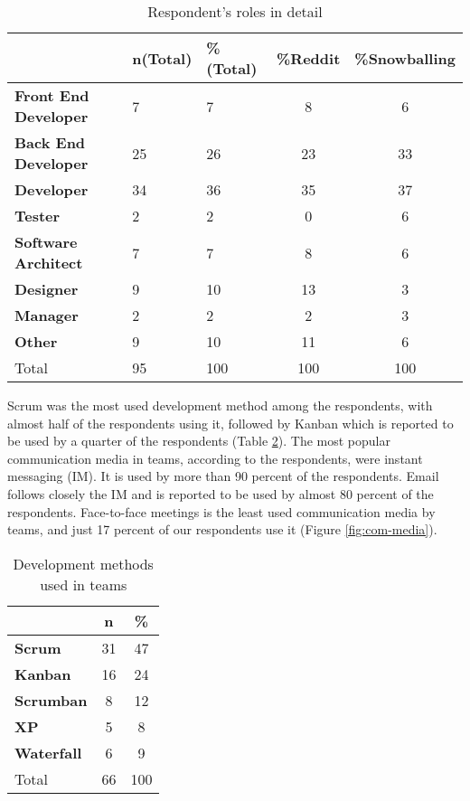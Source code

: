 \begin{table}
\centering
\caption{Respondent’s roles in detail} \label{table:roledetail}
\begin{tabular}{lllcc}
\hline
 & \textbf{n(Total)} & \textbf{\%(Total)} & \textbf{\%Reddit} & \textbf{\%Snowballing} \\ \hline
\textbf{Front End Developer}&7&7&8&6 \\
\textbf{Back End Developer}&25&26&23&33 \\
\textbf{Developer}&34&36&35&37 \\
\textbf{Tester}&2&2&0&6 \\
\textbf{Software Architect}&7&7&8&6 \\
\textbf{Designer}&9&10&13&3 \\
\textbf{Manager}&2&2&2&3 \\
\textbf{Other}&9&10&11&6 \\
Total&95&100&100&100 \\
\hline
\end{tabular}
\end{table}

Scrum was the most used development method among the respondents, with almost half of the respondents using it, followed by Kanban which is reported to be used by a quarter of the respondents (Table \ref{table:dm}). The most popular communication media in teams, according to the respondents, were instant messaging (IM). It is used by more than 90 percent of the respondents. Email follows closely the IM and is reported to be used by almost 80 percent of the respondents. Face-to-face meetings is the least used communication media by teams, and just 17 percent of our respondents use it (Figure \ref{fig:com-media}).

\begin{table}
\centering
\caption{Development methods used in teams} \label{table:dm}
\begin{tabular}{lcc}
\hline
 & \textbf{n} & \textbf{\%} \\ \hline
\textbf{Scrum}&31&47\\
\textbf{Kanban}&16&24\\
\textbf{Scrumban}&8&12\\
\textbf{XP}&5&8\\
\textbf{Waterfall}&6&9\\
Total&66&100\\
\hline
\end{tabular}
\end{table}



